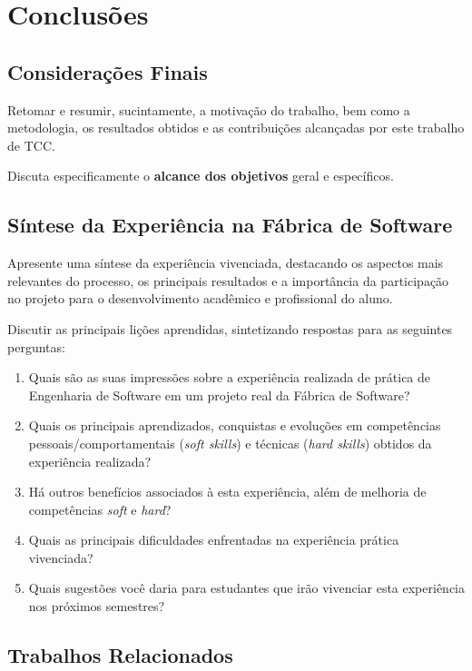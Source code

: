 \chapter{Conclusões}
\label{cap:conclusoes}

\section{Considerações Finais}

Retomar e resumir, sucintamente, a motivação do trabalho, bem como a metodologia, os resultados obtidos e as contribuições alcançadas por este trabalho de TCC.

Discuta especificamente o \textbf{alcance dos objetivos} geral e específicos.

\section{Síntese da Experiência na Fábrica de Software}

Apresente uma síntese da experiência vivenciada, destacando os aspectos mais relevantes do processo, os principais resultados e a importância da participação no projeto para o desenvolvimento acadêmico e profissional do aluno. 

Discutir as principais lições aprendidas, sintetizando respostas para as seguintes perguntas:
\begin{enumerate}
    \item Quais são as suas impressões sobre a experiência realizada de prática de Engenharia de Software em um projeto real da Fábrica de Software?
    \item Quais os principais aprendizados, conquistas e evoluções em competências pessoais/comportamentais (\textit{soft skills}) e técnicas (\textit{hard skills}) obtidos da experiência realizada?
    \item Há outros benefícios associados à esta experiência, além de melhoria de competências \textit{soft} e \textit{hard}?
    \item Quais as principais dificuldades enfrentadas na experiência prática vivenciada?
    \item Quais sugestões você daria para estudantes que irão vivenciar esta experiência nos próximos semestres?
\end{enumerate}

\section{Trabalhos Relacionados}

